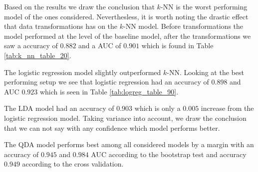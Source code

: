 \documentclass[../../project.tex]{subfiles}
\begin{document}
	Based on the results we draw the conclusion that $k$-NN is the worst performing model of the ones considered. Neverthesless, it is worth noting the drastic effect that data transformations has on the $k$-NN model. Before transformations the model performed at the level of the baseline model, after the transformations we saw a accuracy of $0.882$ and a AUC of $0.901$ which is found in Table \ref{tab:k_nn_table_20}.
	
	The logistic regression model slightly outperformed $k$-NN. Looking at the best performing setup we see that logistic regression had an accuracy of $0.898$ and AUC $0.923$ which is seen in Table \ref{tab:logreg_table_90}. 
	
	The LDA model had an accuracy of $0.903$ which is only a $0.005$ increase from the logistic regression model. Taking variance into account, we draw the conclusion that we can not say with any confidence which model performs better.
	
	The QDA model performs best among all considered models by a margin with an accuracy of $0.945$ and $0.984$ AUC according to the bootstrap test and accuracy $0.949$ according to the cross validation.
	
\end{document}
